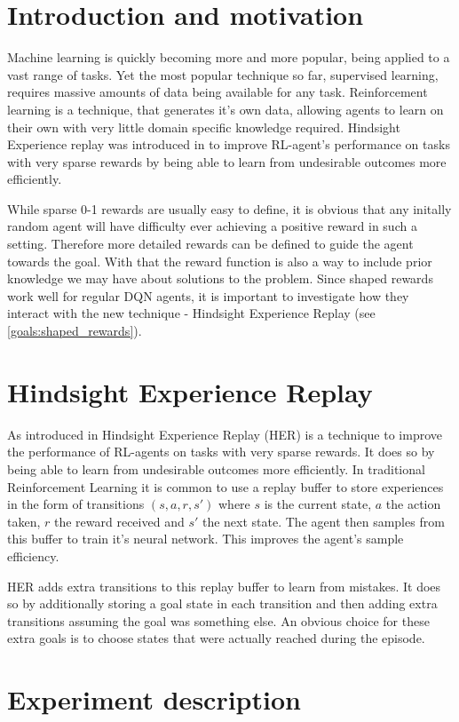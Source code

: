 \section{Introduction and motivation}
Machine learning is quickly becoming more and more popular, being applied to a vast range of tasks. Yet the most popular technique so far, supervised learning, requires massive amounts of data being available for any task. Reinforcement learning is a technique, that generates it's own data, allowing agents to learn on their own with very little domain specific knowledge required.
Hindsight Experience replay was introduced in \parencite{HERPaper} to improve RL-agent's performance on tasks with very sparse rewards by being able to learn from undesirable outcomes more efficiently.

While sparse 0-1 rewards are usually easy to define, it is obvious that any initally random agent will have difficulty ever achieving a positive reward in such a setting. Therefore more detailed rewards can be defined to guide the agent towards the goal. With that the reward function is also a way to include prior knowledge we may have about solutions to the problem. Since shaped rewards work well for regular DQN agents, it is important to investigate how they interact with the new technique - Hindsight Experience Replay (see \ref{goals:shaped_rewards}).
%
%
\section{Hindsight Experience Replay}
As introduced in \parencite{HERPaper} Hindsight Experience Replay (HER)  is a technique to improve the performance of RL-agents on tasks with very sparse rewards. It does so by being able to learn from undesirable outcomes more efficiently. In traditional Reinforcement Learning it is common to use a replay buffer to store experiences in the form of transitions $(s, a, r, s')$ where $s$ is the current state, $a$ the action taken, $r$ the reward received and $s'$ the next state. The agent then samples from this buffer to train it's neural network. This improves the agent's sample efficiency.

HER adds extra transitions to this replay buffer to learn from mistakes. It does so by additionally storing a goal state in each transition and then adding extra transitions assuming the goal was something else. An obvious choice for these extra goals is to choose states that were actually reached during the episode.

%
%
\section{Experiment description}
